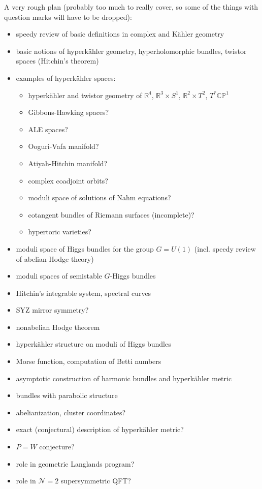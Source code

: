 \documentclass[12pt,letterpaper,reqno]{amsart}
\numberwithin{equation}{section}
\newcommand{\R}{\ensuremath{\mathbb R}}
\newcommand{\C}{\ensuremath{\mathbb C}}
\newcommand{\PP}{\ensuremath{\mathbb P}}
\newcommand{\N}{{\mathcal N}}
\newcommand{\kahler}{K\"ahler\xspace}
\newcommand{\hk}{hyperk\"ahler\xspace}
\begin{document}
A very rough plan (probably too much to really cover,
so some of the things with question marks will have 
to be dropped):
\begin{itemize}
  \item speedy review of basic definitions in complex and \kahler geometry
  \item basic notions of \hk geometry, hyperholomorphic bundles, twistor spaces (Hitchin's theorem)
  \item examples of \hk spaces:
  \begin{itemize}
  \item \hk and twistor geometry of $\R^4$, $\R^3 \times S^1$, $\R^2 \times T^2$, $T^* \C\PP^1$
  \item Gibbons-Hawking spaces?
  \item ALE spaces?
  \item Ooguri-Vafa manifold?
  \item Atiyah-Hitchin manifold?
  \item complex coadjoint orbits?
  \item moduli space of solutions of Nahm equations?
  \item cotangent bundles of Riemann surfaces (incomplete)?
  \item hypertoric varieties?
  \end{itemize}
  \item moduli space of Higgs bundles for the group $G = U(1)$ (incl. speedy review of abelian Hodge theory)
  \item moduli spaces of semistable $G$-Higgs bundles
  \item Hitchin's integrable system, spectral curves
  \item SYZ mirror symmetry?
  \item nonabelian Hodge theorem
  \item \hk structure on moduli of Higgs bundles
  \item Morse function, computation of Betti numbers
  \item asymptotic construction of harmonic bundles and \hk metric
  \item bundles with parabolic structure
  \item abelianization, cluster coordinates?
  \item exact (conjectural) description of \hk metric?
  \item $P=W$ conjecture?
  \item role in geometric Langlands program?
  \item role in $\N=2$ supersymmetric QFT?
\end{itemize}
\end{document}
